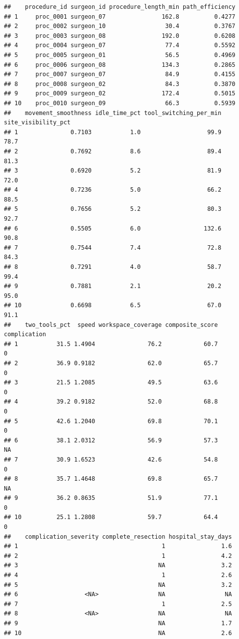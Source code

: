 \documentclass[
]{article}
\begin{document}
\begin{verbatim}
##    procedure_id surgeon_id procedure_length_min path_efficiency
## 1     proc_0001 surgeon_07                162.8          0.4277
## 2     proc_0002 surgeon_10                 30.4          0.3767
## 3     proc_0003 surgeon_08                192.0          0.6208
## 4     proc_0004 surgeon_07                 77.4          0.5592
## 5     proc_0005 surgeon_01                 56.5          0.4969
## 6     proc_0006 surgeon_08                134.3          0.2865
## 7     proc_0007 surgeon_07                 84.9          0.4155
## 8     proc_0008 surgeon_02                 84.3          0.3870
## 9     proc_0009 surgeon_02                172.4          0.5015
## 10    proc_0010 surgeon_09                 66.3          0.5939
##    movement_smoothness idle_time_pct tool_switching_per_min site_visibility_pct
## 1               0.7103           1.0                   99.9                78.7
## 2               0.7692           8.6                   89.4                81.3
## 3               0.6920           5.2                   81.9                72.0
## 4               0.7236           5.0                   66.2                88.5
## 5               0.7656           5.2                   80.3                92.7
## 6               0.5505           6.0                  132.6                90.8
## 7               0.7544           7.4                   72.8                84.3
## 8               0.7291           4.0                   58.7                99.4
## 9               0.7881           2.1                   20.2                95.0
## 10              0.6698           6.5                   67.0                91.1
##    two_tools_pct  speed workspace_coverage composite_score complication
## 1           31.5 1.4904               76.2            60.7            0
## 2           36.9 0.9182               62.0            65.7            0
## 3           21.5 1.2085               49.5            63.6            0
## 4           39.2 0.9182               52.0            68.8            0
## 5           42.6 1.2040               69.8            70.1            0
## 6           38.1 2.0312               56.9            57.3           NA
## 7           30.9 1.6523               42.6            54.8            0
## 8           35.7 1.4648               69.8            65.7           NA
## 9           36.2 0.8635               51.9            77.1            0
## 10          25.1 1.2808               59.7            64.4            0
##    complication_severity complete_resection hospital_stay_days
## 1                                         1                1.6
## 2                                         1                4.2
## 3                                        NA                3.2
## 4                                         1                2.6
## 5                                        NA                3.2
## 6                   <NA>                 NA                 NA
## 7                                         1                2.5
## 8                   <NA>                 NA                 NA
## 9                                        NA                1.7
## 10                                       NA                2.6
\end{verbatim}
\end{document}
